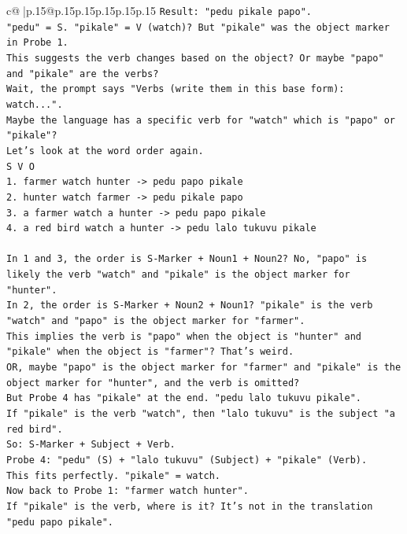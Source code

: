 \documentclass{article}
\begin{document}
{\begin{supertabular}{c@{$\;$}|p{.15\linewidth}@{}p{.15\linewidth}p{.15\linewidth}p{.15\linewidth}p{.15\linewidth}p{.15\linewidth}}
{{{\texttt{Result: "pedu pikale papo".} \\
\texttt{"pedu" = S. "pikale" = V (watch)? But "pikale" was the object marker in Probe 1.} \\
\texttt{This suggests the verb changes based on the object? Or maybe "papo" and "pikale" are the verbs?} \\
\texttt{Wait, the prompt says "Verbs (write them in this base form): watch...".} \\
\texttt{Maybe the language has a specific verb for "watch" which is "papo" or "pikale"?} \\
\texttt{Let's look at the word order again.} \\
\texttt{S V O} \\
\texttt{1. farmer watch hunter {-}> pedu papo pikale} \\
\texttt{2. hunter watch farmer {-}> pedu pikale papo} \\
\texttt{3. a farmer watch a hunter {-}> pedu papo pikale} \\
\texttt{4. a red bird watch a hunter {-}> pedu lalo tukuvu pikale} \\
\\ 
\texttt{In 1 and 3, the order is S{-}Marker + Noun1 + Noun2? No, "papo" is likely the verb "watch" and "pikale" is the object marker for "hunter".} \\
\texttt{In 2, the order is S{-}Marker + Noun2 + Noun1? "pikale" is the verb "watch" and "papo" is the object marker for "farmer".} \\
\texttt{This implies the verb is "papo" when the object is "hunter" and "pikale" when the object is "farmer"? That's weird.} \\
\texttt{OR, maybe "papo" is the object marker for "farmer" and "pikale" is the object marker for "hunter", and the verb is omitted?} \\
\texttt{But Probe 4 has "pikale" at the end. "pedu lalo tukuvu pikale".} \\
\texttt{If "pikale" is the verb "watch", then "lalo tukuvu" is the subject "a red bird".} \\
\texttt{So: S{-}Marker + Subject + Verb.} \\
\texttt{Probe 4: "pedu" (S) + "lalo tukuvu" (Subject) + "pikale" (Verb).} \\
\texttt{This fits perfectly. "pikale" = watch.} \\
\texttt{Now back to Probe 1: "farmer watch hunter".} \\
\texttt{If "pikale" is the verb, where is it? It's not in the translation "pedu papo pikale".} \\
}}}
\end{supertabular}}
\end{document}
